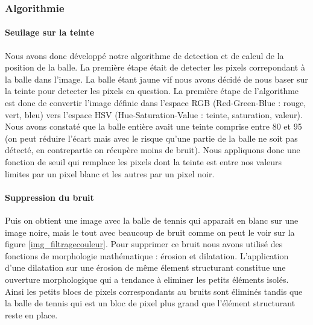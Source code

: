 \subsubsection{Algorithmie}

\paragraph{Seuilage sur la teinte\\}

Nous avons donc développé notre algorithme de detection et de calcul de la position de la balle. La première étape était de detecter les pixels correpondant à la balle dans l'image. La balle étant jaune vif nous avons décidé de nous baser sur la teinte pour detecter les pixels en question. La première étape de l'algorithme est donc de convertir l'image définie dans l'espace RGB (Red-Green-Blue : rouge, vert, bleu) vers l'espace HSV (Hue-Saturation-Value : teinte, saturation, valeur). Nous avons constaté que la balle entière avait une teinte comprise entre 80 et 95 (on peut réduire l'écart mais avec le risque qu'une partie de la balle ne soit pas détecté, en contrepartie on récupère moins de bruit). Nous appliquons donc une fonction de seuil qui remplace les pixels dont la teinte est entre nos valeurs limites par un pixel blanc et les autres par un pixel noir.\\

\paragraph{Suppression du bruit\\}

Puis on obtient une image avec la balle de tennis qui apparait en blanc sur une image noire, mais le tout avec beaucoup de bruit comme on peut le voir sur la figure \ref{img_filtragecouleur}. Pour supprimer ce bruit nous avons utilisé des fonctions de morphologie mathématique : érosion et dilatation. L'application d'une dilatation sur une érosion de même élement structurant constitue une ouverture morphologique qui a tendance à eliminer les petits éléments isolés. Ainsi les petits blocs de pixels correspondants au bruits sont éliminés tandis que la balle de tennis qui est un bloc de pixel plus grand que l'élément structurant reste en place. \\ 

